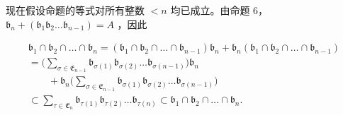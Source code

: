 现在假设命题的等式对所有整数 \(<n\) 均已成立。由命题 6， \(\mathfrak{b}_{n} + (\mathfrak{b}_{1}\mathfrak{b}_{2}\ldots \mathfrak{b}_{n - 1}) = A\) ，因此

\[
\begin{array}{l} \mathfrak {b} _ {1} \cap \mathfrak {b} _ {2} \cap \dots \cap \mathfrak {b} _ {n} = (\mathfrak {b} _ {1} \cap \mathfrak {b} _ {2} \cap \dots \cap \mathfrak {b} _ {n - 1}) \mathfrak {b} _ {n} + \mathfrak {b} _ {n} (\mathfrak {b} _ {1} \cap \mathfrak {b} _ {2} \cap \dots \cap \mathfrak {b} _ {n - 1}) \\ = \Big (\sum_ {\sigma \in \mathfrak {E} _ {n - 1}} \mathfrak {b} _ {\sigma (1)} \mathfrak {b} _ {\sigma (2)} \dots \mathfrak {b} _ {\sigma (n - 1)} \Big) \mathfrak {b} _ {n} \\ \qquad + \mathfrak {b} _ {n} \Big (\sum_ {\sigma \in \mathfrak {E} _ {n - 1}} \mathfrak {b} _ {\sigma (1)} \mathfrak {b} _ {\sigma (2)} \dots \mathfrak {b} _ {\sigma (n - 1)} \Big) \\ \subset \sum_ {\tau \in \mathfrak {E} _ {n}} \mathfrak {b} _ {\tau (1)} \mathfrak {b} _ {\tau (2)} \dots \mathfrak {b} _ {\tau (n)} \subset \mathfrak {b} _ {1} \cap \mathfrak {b} _ {2} \cap \dots \cap \mathfrak {b} _ {n}. \end{array}
\]

